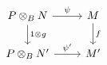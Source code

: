 \documentclass[12pt]{standalone}
\begin{document}
        $$

\begin{tikzcd}
 P \otimes_B N \ar[d,"1 \otimes g"] \ar[r,"\psi"] & M \ar[d,"f"] \\
 P \otimes_B N^\prime \ar[r,"\psi^\prime"] & M^\prime 
\end{tikzcd}
        $$
        
\end{document}
